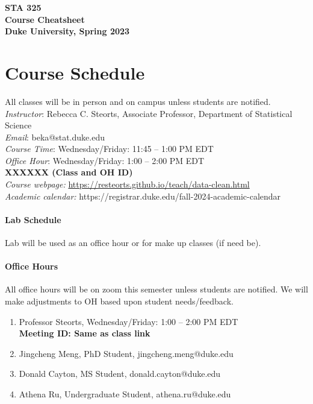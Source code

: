 \documentclass[11pt]{article}
\date{}
\begin{document}
\begin{center}
{\Large\bf STA 325\\ Course Cheatsheet} \\

{\Large\bf Duke University, Spring 2023} \\
\end{center}


\section{Course Schedule}
All classes will be in person and on campus unless students are notified. \\
\emph{Instructor}: Rebecca C. Steorts,  Associate Professor,  Department of Statistical Science\\
\emph{Email}: beka@stat.duke.edu\\
\emph{Course Time}: Wednesday/Friday: 11:45 -- 1:00 PM EDT \\
\emph{Office Hour}: Wednesday/Friday: 1:00 -- 2:00 PM EDT \\
\textbf{XXXXXX (Class and OH ID)}\\
\emph{Course webpage:} \url{https://resteorts.github.io/teach/data-clean.html} \\
\emph{Academic calendar:} https://registrar.duke.edu/fall-2024-academic-calendar


\paragraph{Lab Schedule}
Lab will be used as an office hour or for make up classes (if need be). 





\paragraph{Office Hours}
All office hours will be on zoom this semester unless students are notified. We will make adjustments to OH based upon student needs/feedback. 
\begin{enumerate}
\item Professor Steorts, Wednesday/Friday: 1:00 -- 2:00 PM EDT \\
\textbf{Meeting ID: Same as class link}
\item Jingcheng Meng, PhD Student, jingcheng.meng@duke.edu\\
\item Donald Cayton, MS Student, donald.cayton@duke.edu\\
\item Athena Ru, Undergraduate Student, athena.ru@duke.edu \\ 
\end{enumerate}
\end{document}
